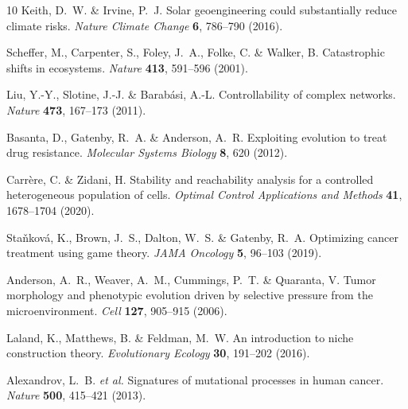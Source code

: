\documentclass[11pt,a4paper]{article}
\begin{document}
\begin{thebibliography}{10}
Keith, D.~W. \& Irvine, P.~J.
\newblock Solar geoengineering could substantially reduce climate risks.
\newblock \textit{Nature Climate Change} \textbf{6}, 786--790 (2016).

Scheffer, M., Carpenter, S., Foley, J.~A., Folke, C. \& Walker, B.
\newblock Catastrophic shifts in ecosystems.
\newblock \textit{Nature} \textbf{413}, 591--596 (2001).

Liu, Y.-Y., Slotine, J.-J. \& Barabási, A.-L.
\newblock Controllability of complex networks.
\newblock \textit{Nature} \textbf{473}, 167--173 (2011).

Basanta, D., Gatenby, R.~A. \& Anderson, A.~R.
\newblock Exploiting evolution to treat drug resistance.
\newblock \textit{Molecular Systems Biology} \textbf{8}, 620 (2012).

Carrère, C. \& Zidani, H.
\newblock Stability and reachability analysis for a controlled heterogeneous population of cells.
\newblock \textit{Optimal Control Applications and Methods} \textbf{41}, 1678--1704 (2020).

Staňková, K., Brown, J.~S., Dalton, W.~S. \& Gatenby, R.~A.
\newblock Optimizing cancer treatment using game theory.
\newblock \textit{JAMA Oncology} \textbf{5}, 96--103 (2019).

Anderson, A.~R., Weaver, A.~M., Cummings, P.~T. \& Quaranta, V.
\newblock Tumor morphology and phenotypic evolution driven by selective pressure from the microenvironment.
\newblock \textit{Cell} \textbf{127}, 905--915 (2006).

Laland, K., Matthews, B. \& Feldman, M.~W.
\newblock An introduction to niche construction theory.
\newblock \textit{Evolutionary Ecology} \textbf{30}, 191--202 (2016).

Alexandrov, L.~B. \textit{et al.}
\newblock Signatures of mutational processes in human cancer.
\newblock \textit{Nature} \textbf{500}, 415--421 (2013).

\end{thebibliography}
\end{document}

